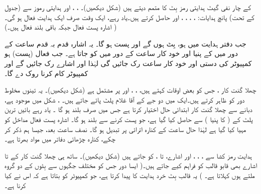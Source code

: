  کے چار   نفی گیٹ  ہدایتی رمز بِٹ  کا متمم دیتے ہیں (شکل  دیکھیں)۔ ، ، اور ہدایتی  رموز سے  (جدول  کے تحت) پانچ  ہدایات: ، ، ، ، اور    حاصل کرتے ہیں۔یاد رہے، ایک وقت صرف ایک ہدایت فعال ہو گی۔ ( اشارہ پست فعال جبکہ باقی بلند فعال ہیں۔)

جب   دفتر ہدایت میں  ہو،  بِٹ  ہوں گے اور    پست ہو گا۔ یہ اشارہ   قدم بہ قدم  ساعت  کے  دور  میں   کے پنیا  اور خود کار ساعت کے دور میں  کو جاتا ہے۔  جب    فعال (پست) ہو کمپیوٹر کی دستی اور خود کار  ساعت  رک جائیں گی  لہٰذا  اور  اشارے رک جائیں گے اور کمپیوٹر  کام کرنا روک  دے گا۔

چھلا گنت کار ، جس کو بعض اوقات کہتے ہیں، ، ، اور  پر مشتمل ہے (شکل  دیکھیں)۔ یہ  تینوں  مخلوط دور  کو ظاہر کرتے ہیں۔ایک  میں  دو جے کے آقا غلام پلٹ پائے جاتے ہیں۔ ، شکل  میں موجود ہے،  دبانے سے   چھلا گنت کار  ابتدائی  حال اختیار کرتا ہے جس میں صرف  بلند ہو گا ۔ یاد رہے  بائیں ترین پلٹ کے  ( کا پنیا ) سے  حاصل کیا گیا ہے، جو  پست  کرنے سے  بلند ہو گا۔  اشارہ  پست فعال مداخل کو مہیا کیا گیا ہے لہٰذا  حال ساعت کے کنارہ اترائی پر تبدیل ہو گا۔ نصف ساعت بعد، جیسا ہم ذکر کر چکے، کنارہ چڑھائی  دفاتر میں مواد بھرتا  ہے۔

ہدایت رمز کشا سے ، ، ،  اور   اشارے،  تا ، کو جاتے ہیں (شکل  دیکھیں)۔ ساتھ ہی چھلا گنت کار کے  تا   اشارے بھی قابو قالب کو فراہم کیے جاتے ہیں۔( ایسا  دور جس کو  مختلف جگہوں سے بِٹوں کے دو گروہ ملتے ہوں کہلاتا ہے۔ ) یہ قالب  بِٹ  خرد ہدایت کا  پیدا کرتا ہے، جو کمپیوٹر کو بتاتا ہے کہ اس نے کیا کرنا ہے۔

